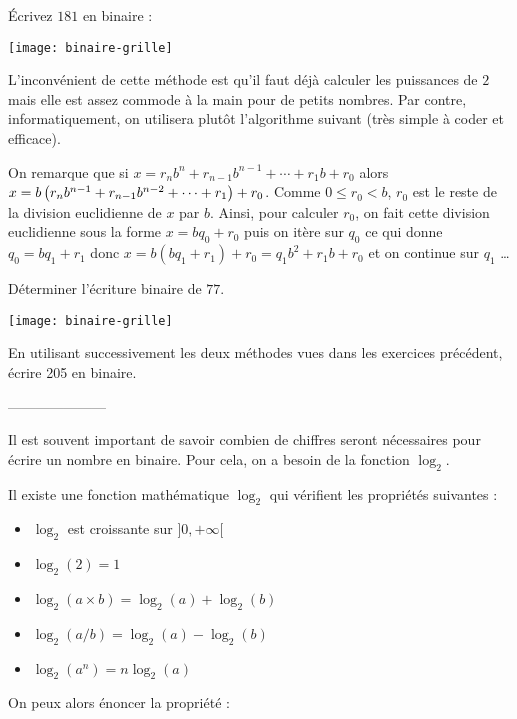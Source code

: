 \medskip

\'Ecrivez $181$ en binaire :


\begin{center}
\texttt{[image: binaire-grille]}
\end{center}

\medskip


L'inconvénient de cette méthode est qu'il faut déjà calculer les puissances de $2$ mais elle est assez commode à la main pour de petits nombres. Par contre, informatiquement, on utilisera plutôt l'algorithme suivant (très simple à coder et efficace).

\bigskip
{}
\medskip

On remarque que si $x = r_n b^n + r_{n-1} b^{n-1} + \cdots + r_1 b + r_0$ alors $x = b \left( r_n b^{n-1} + r_{n-1} b^{n-2} + \cdots + r_1  \right) + r_0$. Comme $0 \leq r_0 < b$, $r_0$ est le reste de la division euclidienne de $x$ par $b$. Ainsi, pour calculer $r_0$, on fait cette division euclidienne sous la forme $x=bq_0+r_0$ puis on itère sur $q_0$ ce qui donne $q_0 = b q_1 + r_1$ donc $x = b(bq_1+r_1)+r_0 = q_1 b^2 + r_1 b + r_0$ et on continue sur $q_1$ \dots 

Déterminer l'écriture binaire de $77$.

\begin{center}
	\texttt{[image: binaire-grille]}
\end{center}



\entrainement{}

En utilisant successivement les deux méthodes vues dans les exercices précédent, écrire 205 en binaire.
\begin{center}
	---------------------
\end{center}


Il est souvent important de savoir combien de chiffres seront nécessaires pour écrire un nombre en binaire. Pour cela, on a besoin de la fonction $\log_2$.




\smallskip

\begin{propriété}{}
Il existe une fonction mathématique $\log_2$ qui vérifient les propriétés suivantes : 

\begin{itemize}
	\item $\log_2$ est croissante sur $]0, +\infty[$
	\item $\log_2(2) = 1$
	\item $\log_2(a\times b)=\log_2(a)+\log_2(b)$
	\item $\log_2(a/ b)=\log_2(a)-\log_2(b)$
	\item $\log_2(a^n) = n\log_2(a)$
\end{itemize}

\end{propriété}
On peux alors énoncer la propriété :

